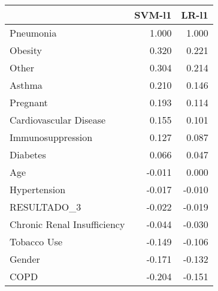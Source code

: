 \begin{tabular}{lrr}
\toprule
{} &  SVM-l1 &  LR-l1 \\
\midrule
Pneumonia                   &   1.000 &  1.000 \\
Obesity                     &   0.320 &  0.221 \\
Other                       &   0.304 &  0.214 \\
Asthma                      &   0.210 &  0.146 \\
Pregnant                    &   0.193 &  0.114 \\
Cardiovascular Disease      &   0.155 &  0.101 \\
Immunosuppression           &   0.127 &  0.087 \\
Diabetes                    &   0.066 &  0.047 \\
Age                         &  -0.011 &  0.000 \\
Hypertension                &  -0.017 & -0.010 \\
RESULTADO\_3                 &  -0.022 & -0.019 \\
Chronic Renal Insufficiency &  -0.044 & -0.030 \\
Tobacco Use                 &  -0.149 & -0.106 \\
Gender                      &  -0.171 & -0.132 \\
COPD                        &  -0.204 & -0.151 \\
\bottomrule
\end{tabular}
